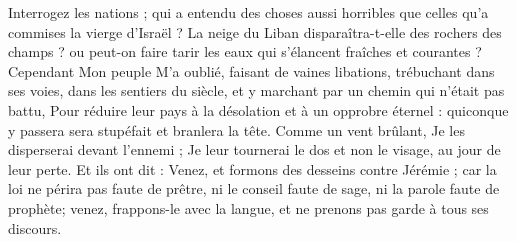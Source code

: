 Interrogez les nations ; qui a entendu des choses aussi horribles que celles qu'a commises la vierge d'Israël ?
La neige du Liban disparaîtra-t-elle des rochers des champs ? ou peut-on faire tarir les eaux qui s'élancent fraîches et courantes ?
Cependant Mon peuple M'a oublié, faisant de vaines libations, trébuchant dans ses voies, dans les sentiers du siècle, et y marchant par un chemin qui n'était pas battu,
Pour réduire leur pays à la désolation et à un opprobre éternel : quiconque y passera sera stupéfait et branlera la tête.
Comme un vent brûlant, Je les disperserai devant l'ennemi ; Je leur tournerai le dos et non le visage, au jour de leur perte.
Et ils ont dit : Venez, et formons des desseins contre Jérémie ; car la loi ne périra pas faute de prêtre, ni le conseil faute de sage, ni la parole faute de prophète; venez, frappons-le avec la langue, et ne prenons pas garde à tous ses discours.